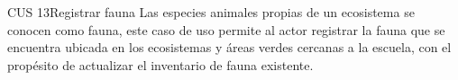 
\begin{UseCase}{CUS 13}{Registrar fauna}
    {
    Las especies animales propias de un ecosistema se conocen como fauna, este caso de uso permite al actor registrar la fauna que se encuentra ubicada en los ecosistemas y áreas verdes cercanas a la escuela, con el propésito de actualizar el inventario de fauna existente.
    }
    
    


\end{UseCase}
